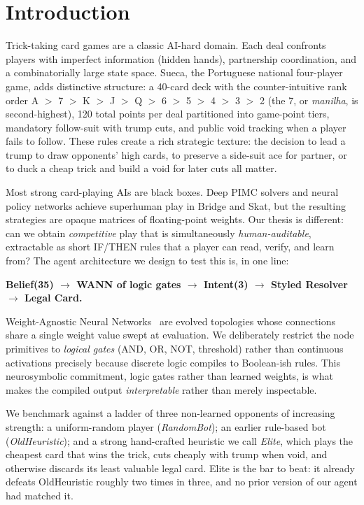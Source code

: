 \documentclass[runningheads]{llncs}
\begin{document}
\section{Introduction}

Trick-taking card games are a classic AI-hard domain. Each deal confronts
players with imperfect information (hidden hands), partnership coordination,
and a combinatorially large state space. Sueca, the Portuguese national
four-player game, adds distinctive structure: a 40-card deck with the
counter-intuitive rank order A $>$ 7 $>$ K $>$ J $>$ Q $>$ 6 $>$ 5 $>$ 4 $>$
3 $>$ 2 (the 7, or \emph{manilha}, is second-highest), 120 total points per
deal partitioned into game-point tiers, mandatory follow-suit with trump cuts,
and public void tracking when a player fails to follow. These rules create a
rich strategic texture: the decision to lead a trump to draw opponents' high
cards, to preserve a side-suit ace for partner, or to duck a cheap trick and
build a void for later cuts all matter.

Most strong card-playing AIs are black boxes. Deep PIMC solvers and neural
policy networks achieve superhuman play in Bridge and Skat, but the resulting
strategies are opaque matrices of floating-point weights. Our thesis is
different: can we obtain \emph{competitive} play that is simultaneously
\emph{human-auditable}, extractable as short IF/THEN rules that a player can
read, verify, and learn from? The agent architecture we design to test this is,
in one line:

\begin{center}
\textbf{Belief(35) $\rightarrow$ WANN of logic gates $\rightarrow$ Intent(3)
$\rightarrow$ Styled Resolver $\rightarrow$ Legal Card.}
\end{center}

Weight-Agnostic Neural Networks~\cite{gaier2019wann} are evolved topologies
whose connections share a single weight value swept at evaluation. We
deliberately restrict the node primitives to \emph{logical gates} (AND, OR,
NOT, threshold) rather than continuous activations precisely because discrete
logic compiles to Boolean-ish rules. This neurosymbolic commitment, logic
gates rather than learned weights, is what makes the compiled output
\emph{interpretable} rather than merely inspectable.

We benchmark against a ladder of three non-learned opponents of increasing
strength: a uniform-random player (\emph{RandomBot}); an earlier rule-based bot
(\emph{OldHeuristic}); and a strong hand-crafted heuristic we call \emph{Elite},
which plays the cheapest card that wins the trick, cuts cheaply with trump when
void, and otherwise discards its least valuable legal card. Elite is the bar to
beat: it already defeats OldHeuristic roughly two times in three, and no prior
version of our agent had matched it.
\end{document}
